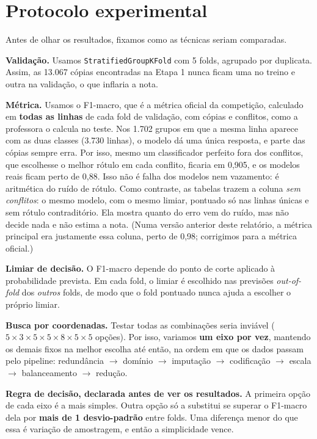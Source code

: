 \documentclass[11pt,a4paper]{article}
\begin{document}
\section{Protocolo experimental}

Antes de olhar os resultados, fixamos como as técnicas seriam comparadas.

\textbf{Validação.} Usamos \texttt{StratifiedGroupKFold} com 5 folds, agrupado por duplicata. Assim, as 13.067 cópias encontradas na Etapa 1 nunca ficam uma no treino e outra na validação, o que inflaria a nota.

\textbf{Métrica.} Usamos o F1-macro, que é a métrica oficial da competição, calculado em \textbf{todas as linhas} de cada fold de validação, com cópias e conflitos, como a professora o calcula no teste. Nos 1.702 grupos em que a mesma linha aparece com as duas classes (3.730 linhas), o modelo dá uma única resposta, e parte das cópias sempre erra. Por isso, mesmo um classificador perfeito fora dos conflitos, que escolhesse o melhor rótulo em cada conflito, ficaria em 0,905, e os modelos reais ficam perto de 0,88. Isso não é falha dos modelos nem vazamento: é aritmética do ruído de rótulo. Como contraste, as tabelas trazem a coluna \emph{sem conflitos}: o mesmo modelo, com o mesmo limiar, pontuado só nas linhas únicas e sem rótulo contraditório. Ela mostra quanto do erro vem do ruído, mas não decide nada e não estima a nota. (Numa versão anterior deste relatório, a métrica principal era justamente essa coluna, perto de 0,98; corrigimos para a métrica oficial.)

\textbf{Limiar de decisão.} O F1-macro depende do ponto de corte aplicado à probabilidade prevista. Em cada fold, o limiar é escolhido nas previsões \emph{out-of-fold} dos \emph{outros} folds, de modo que o fold pontuado nunca ajuda a escolher o próprio limiar.

\textbf{Busca por coordenadas.} Testar todas as combinações seria inviável ($5 \times 3 \times 5 \times 5 \times 8 \times 5 \times 5$ opções). Por isso, variamos \textbf{um eixo por vez}, mantendo os demais fixos na melhor escolha até então, na ordem em que os dados passam pelo pipeline: redundância $\rightarrow$ domínio $\rightarrow$ imputação $\rightarrow$ codificação $\rightarrow$ escala $\rightarrow$ balanceamento $\rightarrow$ redução.

\textbf{Regra de decisão, declarada antes de ver os resultados.} A primeira opção de cada eixo é a mais simples. Outra opção só a substitui se superar o F1-macro dela por \textbf{mais de 1 desvio-padrão} entre folds. Uma diferença menor do que essa é variação de amostragem, e então a simplicidade vence.
\end{document}
